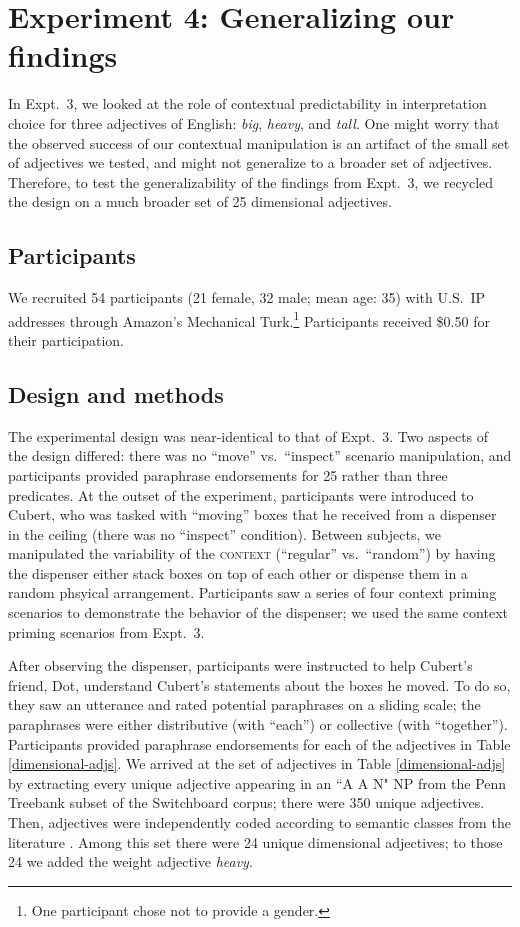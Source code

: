 \documentclass[preprint,12pt,authoryear,titlepage]{elsarticle}
\begin{document}
\section{Experiment 4: Generalizing our findings}

In Expt.~3, we looked at the role of contextual predictability in interpretation choice for three adjectives of English: \emph{big}, \emph{heavy}, and \emph{tall}. One might worry that the observed success of our contextual manipulation is an artifact of the small set of adjectives we %
tested, and might not generalize to a broader set of adjectives. Therefore, to test the generalizability of the findings from Expt.~3, we recycled the design on a much broader set of 25 dimensional adjectives.

\subsection{Participants}

We recruited 54 participants (21 female, 32 male; mean age: 35) with U.S.~IP addresses through Amazon's Mechanical Turk.\footnote{One participant chose not to provide a gender.} Participants received \$0.50 for their participation.

\subsection{Design and methods}

The experimental design was near-identical to that of Expt.~3. Two aspects of the design differed: there was no ``move'' vs.~``inspect'' scenario manipulation, and participants provided paraphrase endorsements for 25 rather than three predicates. At the outset of the experiment, participants were introduced to Cubert, who was tasked with ``moving'' boxes that he received from a dispenser in the ceiling (there was no ``inspect'' condition). Between subjects, we manipulated the variability of the \textsc{context} (``regular'' vs.~``random'') by having the dispenser either stack boxes on top of each other or dispense them in a random phsyical arrangement. Participants saw a series of four context priming scenarios to demonstrate the behavior of the dispenser; we used the same context priming scenarios from Expt.~3.

After observing the dispenser, participants were instructed to help Cubert's friend, Dot, understand Cubert's statements about the boxes he moved. To do so, they saw an utterance and rated potential paraphrases on a sliding scale; the paraphrases were either distributive (with ``each'') or collective (with ``together''). Participants provided paraphrase endorsements for each of the adjectives in Table \ref{dimensional-adjs}. We arrived at the set of adjectives in Table \ref{dimensional-adjs} by extracting every unique adjective appearing in an ``A A N" NP from the Penn Treebank subset of the Switchboard corpus; there were 350 unique adjectives. Then, adjectives were independently coded according to semantic classes from the literature \citep[e.g.,][]{dixon1982}. Among this set there were 24 unique dimensional adjectives; to those 24 we added the weight adjective \emph{heavy}.
\end{document}
